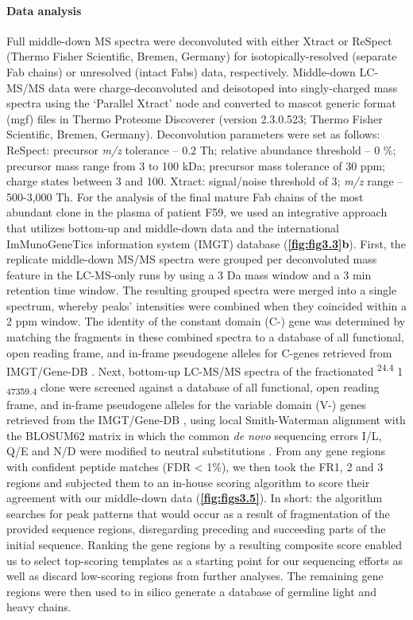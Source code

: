 \paragraph{Data analysis}
Full middle-down MS spectra were deconvoluted with either Xtract \cite{zabrouskov2005new} or ReSpect (Thermo Fisher Scientific, Bremen, Germany) for isotopically-resolved (separate Fab chains) or unresolved (intact Fabs) data, respectively. Middle-down LC-MS/MS data were charge-deconvoluted and deisotoped into singly-charged mass spectra using the ‘Parallel Xtract’ node and converted to mascot generic format (mgf) files in Thermo Proteome Discoverer (version 2.3.0.523; Thermo Fisher Scientific, Bremen, Germany). Deconvolution parameters were set as follows: ReSpect: precursor \emph{m/z} tolerance – 0.2 Th; relative abundance threshold – 0 \%; precursor mass range from 3 to 100 kDa; precursor mass tolerance of 30 ppm; charge states between 3 and 100. Xtract: signal/noise threshold of 3; \emph{m/z} range – 500-3,000 Th.
For the analysis of the final mature Fab chains of the most abundant clone in the plasma of patient F59, we used an integrative approach that utilizes bottom-up and middle-down data and the international ImMunoGeneTics information system (IMGT) database (\textbf{\autoref{fig:fig3.3}b}). First, the replicate middle-down MS/MS spectra were grouped per deconvoluted mass feature in the LC-MS-only runs by using a 3 Da mass window and a 3 min retention time window. The resulting grouped spectra were merged into a single spectrum, whereby peaks’ intensities were combined when they coincided within a 2 ppm window. The identity of the constant domain (C-) gene was determined by matching the fragments in these combined spectra to a database of all functional, open reading frame, and in-frame pseudogene alleles for C-genes retrieved from IMGT/Gene-DB \cite{lefranc1999imgt}. Next, bottom-up LC-MS/MS spectra of the fractionated \textsuperscript{24.4} 1 \textsubscript{47359.4} clone were screened against a database of all functional, open reading frame, and in-frame pseudogene alleles for the variable domain (V-) genes retrieved from the IMGT/Gene-DB \cite{lefranc1999imgt}, using local Smith-Waterman alignment with the BLOSUM62 matrix in which the common \emph{de novo} sequencing errors I/L, Q/E and N/D were modified to neutral substitutions \cite{smith1981identification}. From any gene regions with confident peptide matches (FDR < 1\%), we then took the FR1, 2 and 3 regions and subjected them to an in-house scoring algorithm to score their agreement with our middle-down data (\textbf{\autoref{fig:figs3.5}}). In short: the algorithm searches for peak patterns that would occur as a result of fragmentation of the provided sequence regions, disregarding preceding and succeeding parts of the initial sequence. Ranking the gene regions by a resulting composite score enabled us to select top-scoring templates as a starting point for our sequencing efforts as well as discard low-scoring regions from further analyses. The remaining gene regions were then used to in silico generate a database of germline light and heavy chains.
